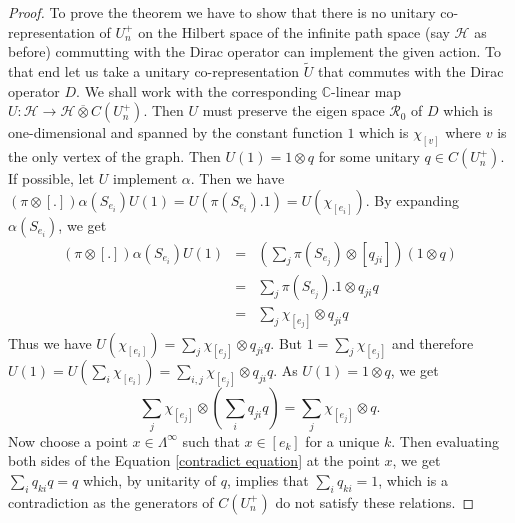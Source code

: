 \documentclass{amsart}
\theoremstyle{plain}
\theoremstyle{definition}
\theoremstyle{remark}
\numberwithin{equation}{section}
\newcommand{\cal}{\mathcal}
\newcommand{\clh}{{\cal H}}
\newcommand{\clr}{{\cal R}}
\newcommand{\raro}{\rightarrow}
\begin{document}
\begin{proof}
    To prove the theorem we have to show that there is no unitary co-representation of $U_{n}^{+}$ on the Hilbert space of the infinite path space (say $\clh$ as before) commutting with the Dirac operator can implement the given action. To that end let us take a unitary co-representation $\widetilde{U}$ that commutes with the Dirac operator $D$. We shall work with the corresponding $\mathbb{C}$-linear map $U:\clh\raro\clh\overline{\otimes}C(U_{n}^{+})$. Then $U$ must preserve the eigen space $\clr_{0}$ of $D$ which is one-dimensional and spanned by the constant function $1$ which is $\chi_{[v]}$ where $v$ is the only vertex of the graph.  Then $U(1)=1\otimes q$ for some unitary $q\in C(U_{n}^{+})$. If possible, let $U$ implement $\alpha$. Then we have $(\pi\otimes [.])\alpha(S_{e_{i}})U(1)=U(\pi(S_{e_{i}}).1)=U(\chi_{[e_{i}]})$. By expanding $\alpha(S_{e_{i}})$, we get
\begin{eqnarray*}
    (\pi\otimes [.])\alpha(S_{e_{i}})U(1)
    &=&(\sum\limits_{j}\pi(S_{e_{j}})\otimes [q_{ji}])(1\otimes q)\\
    &=&\sum\limits_{j} \pi(S_{e_{j}}).1\otimes q_{ji}q \\
    &=&\sum\limits_{j} \chi_{[e_{j}]}\otimes q_{ji}q 
\end{eqnarray*}
Thus we have $U(\chi_{[e_{i}]})=\sum\limits_{j} \chi_{[e_{j}]}\otimes q_{ji}q$. But $1=\sum\limits_{j}\chi_{[e_{j}]}$ and therefore $U(1)=U(\sum\limits_{i}\chi_{[e_{i}]})=\sum\limits_{i,j}\chi_{[e_{j}]}\otimes q_{ji}q$. As $U(1)=1\otimes q$, we get 
\begin{equation}\label{contradict equation}\sum\limits_{j}\chi_{[e_{j}]}\otimes \left(\sum\limits_{i}q_{ji}q \right)=\sum\limits_{j}\chi_{[e_{j}]}\otimes q.\end{equation} Now choose a point $x\in\Lambda^{\infty}$ such that $x\in[e_{k}]$ for a unique $k$. Then evaluating both sides of the Equation \ref{contradict equation} at the point $x$, we get
$\sum_{i}q_{ki}q=q$ which, by unitarity of $q$, implies that $\sum_{i}q_{ki}=1$, which is a contradiction as the generators of $C(U_{n}^{+})$ do not satisfy these relations.
\end{proof}
\end{document}
